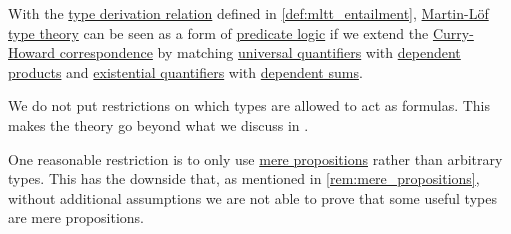 \begin{remark}\label{rem:mltt_hol}
  With the \hyperref[def:type_derivation_relation]{type derivation relation} defined in \cref{def:mltt_entailment}, \hyperref[def:mltt]{Martin-L\"of type theory} can be seen as a form of \hyperref[rem:predicate_logic]{predicate logic} if we extend the \hyperref[con:curry_howard_correspondence]{Curry-Howard correspondence} by matching \hyperref[def:predicate_logic_alphabet/quantifiers/universal]{universal quantifiers} with \hyperref[def:dependent_product]{dependent products} and \hyperref[def:predicate_logic_alphabet/quantifiers/existential]{existential quantifiers} with \hyperref[def:dependent_sum]{dependent sums}.

  We do not put restrictions on which types are allowed to act as formulas. This makes the theory go beyond what we discuss in .

  One reasonable restriction is to only use \hyperref[def:mere_proposition]{mere propositions} rather than arbitrary types. This has the downside that, as mentioned in \cref{rem:mere_propositions}, without additional assumptions we are not able to prove that some useful types are mere propositions.
\end{remark}

